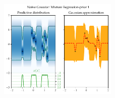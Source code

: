 \begin{figure}
    \includegraphics[width=0.5\textwidth]{Pictures/1D_mixture_regression_Naive GMR_N_10.pdf}
\end{figure}


